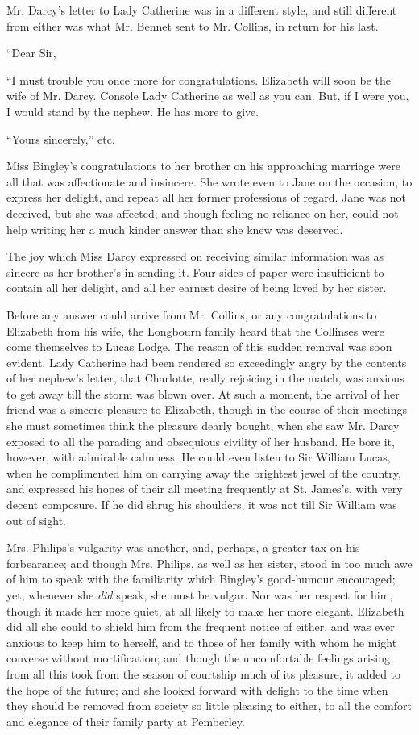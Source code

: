 \documentclass[12pt,openright]{book}
\begin{document}
Mr. Darcy’s letter to Lady Catherine was in a different style, and still different from either was what Mr. Bennet sent to Mr. Collins, in return for his last.

“Dear Sir,

“I must trouble you once more for congratulations. Elizabeth will soon be the wife of Mr. Darcy. Console Lady Catherine as well as you can. But, if I were you, I would stand by the nephew. He has more to give.

“Yours sincerely,” etc.


Miss Bingley’s congratulations to her brother on his approaching marriage were all that was affectionate and insincere. She wrote even to Jane on the occasion, to express her delight, and repeat all her former professions of regard. Jane was not deceived, but she was affected; and though feeling no reliance on her, could not help writing her a much kinder answer than she knew was deserved.

The joy which Miss Darcy expressed on receiving similar information was as sincere as her brother’s in sending it. Four sides of paper were insufficient to contain all her delight, and all her earnest desire of being loved by her sister.

Before any answer could arrive from Mr. Collins, or any congratulations to Elizabeth from his wife, the Longbourn family heard that the Collinses were come themselves to Lucas Lodge. The reason of this sudden removal was soon evident. Lady Catherine had been rendered so exceedingly angry by the contents of her nephew’s letter, that Charlotte, really rejoicing in the match, was anxious to get away till the storm was blown over. At such a moment, the arrival of her friend was a sincere pleasure to Elizabeth, though in the course of their meetings she must sometimes think the pleasure dearly bought, when she saw Mr. Darcy exposed to all the parading and obsequious civility of her husband. He bore it, however, with admirable calmness. He could even listen to Sir William Lucas, when he complimented him on carrying away the brightest jewel of the country, and expressed his hopes of their all meeting frequently at St. James’s, with very decent composure. If he did shrug his shoulders, it was not till Sir William was out of sight.

Mrs. Philips’s vulgarity was another, and, perhaps, a greater tax on his forbearance; and though Mrs. Philips, as well as her sister, stood in too much awe of him to speak with the familiarity which Bingley’s good-humour encouraged; yet, whenever she \textit{did} speak, she must be vulgar. Nor was her respect for him, though it made her more quiet, at all likely to make her more elegant. Elizabeth did all she could to shield him from the frequent notice of either, and was ever anxious to keep him to herself, and to those of her family with whom he might converse without mortification; and though the uncomfortable feelings arising from all this took from the season of courtship much of its pleasure, it added to the hope of the future; and she looked forward with delight to the time when they should be removed from society so little pleasing to either, to all the comfort and elegance of their family party at Pemberley.
\end{document}
